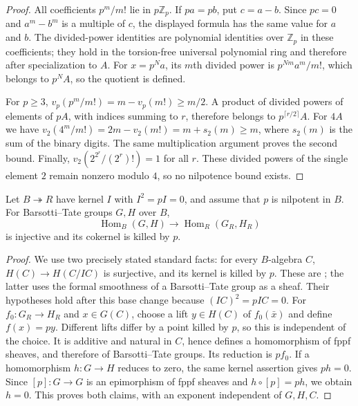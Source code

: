 \begin{proof}
All coefficients $p^m/m!$ lie in $p\mathbb Z_p$. If $pa=pb$, put
$c=a-b$. Since $pc=0$ and $a^m-b^m$ is a multiple of $c$, the displayed
formula has the same value for $a$ and $b$. The divided-power identities
are polynomial identities over $\mathbb Z_p$ in these coefficients;
they hold in the torsion-free universal polynomial ring and therefore
after specialization to $A$. For $x=p^Na$, its $m$th divided power is
$p^{Nm}a^m/m!$, which belongs to $p^NA$, so the quotient is defined.

For $p\geq3$,
$v_p(p^m/m!)=m-v_p(m!)\geq m/2$. A product of divided powers of
elements of $pA$, with indices summing to $r$, therefore belongs to
$p^{\lceil r/2\rceil}A$. For $4A$ we have
$v_2(4^m/m!)=2m-v_2(m!)=m+s_2(m)\geq m$, where $s_2(m)$ is the sum
of the binary digits. The same multiplication argument proves the
second bound. Finally,
$v_2(2^{2^r}/(2^r)!)=1$ for all $r$. These divided powers of the single
element $2$ remain nonzero modulo $4$, so no nilpotence bound exists.
\end{proof}

\begin{lemma}
\label{B:square-zero-Hom}
Let $B\twoheadrightarrow R$ have kernel $I$ with $I^2=pI=0$, and assume
that $p$ is nilpotent in $B$. For Barsotti--Tate groups $G,H$ over $B$,
\[
 \operatorname{Hom}_B(G,H)\longrightarrow
 \operatorname{Hom}_R(G_R,H_R)
\]
is injective and its cokernel is killed by $p$.
\end{lemma}

\begin{proof}
We use two precisely stated standard facts: for every $B$-algebra $C$,
$H(C)\to H(C/IC)$ is surjective, and its kernel is killed by $p$.
These are \cite[Lemmas 3.2 and 3.3]{B:LauRelations}; the latter uses the
formal smoothness of a Barsotti--Tate group as a sheaf. Their hypotheses
hold after this base change because $(IC)^2=pIC=0$.
For $f_0:G_R\to H_R$ and $x\in G(C)$, choose a lift
$y\in H(C)$ of $f_0(\bar x)$ and define $f(x)=py$.
Different lifts differ by a point killed by $p$, so this is independent
of the choice. It is additive and natural in $C$, hence defines a
homomorphism of fppf sheaves, and therefore of Barsotti--Tate groups.
Its reduction is $pf_0$.
If a homomorphism $h:G\to H$ reduces to zero, the same kernel assertion
gives $ph=0$. Since $[p]:G\to G$ is an epimorphism of fppf sheaves and
$h\circ[p]=ph$, we obtain $h=0$.
This proves both claims, with an exponent independent of $G,H,C$.
\end{proof}

